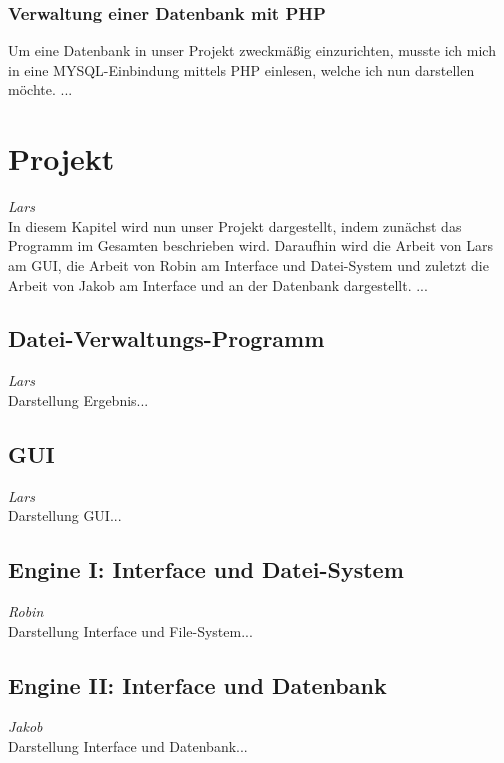 \documentclass[12pt,a4paper,bibliography=totocnumbered,listof=totocnumbered]{scrartcl}
\begin{document}
\subsubsection{Verwaltung einer Datenbank mit PHP}
Um eine Datenbank in unser Projekt zweckmäßig einzurichten, musste ich mich in eine MYSQL-Einbindung mittels PHP einlesen, welche ich nun darstellen möchte.
...

\pagebreak

\section{Projekt}
\label{sec:Projekt}
\emph{Lars}\\
In diesem Kapitel wird nun unser Projekt dargestellt, indem zunächst das Programm im Gesamten beschrieben wird. Daraufhin wird die Arbeit von Lars am GUI, die Arbeit von Robin am Interface und Datei-System und zuletzt die Arbeit von Jakob am Interface und an der Datenbank dargestellt. 
...

\subsection{Datei-Verwaltungs-Programm}
\emph{Lars}\\
Darstellung Ergebnis...

\subsection{GUI}
\emph{Lars}\\
Darstellung GUI...

\subsection{Engine I: Interface und Datei-System}
\emph{Robin}\\
Darstellung Interface und File-System...

\subsection{Engine II: Interface und Datenbank}
\emph{Jakob}\\
Darstellung Interface und Datenbank...
\pagebreak
\end{document}
